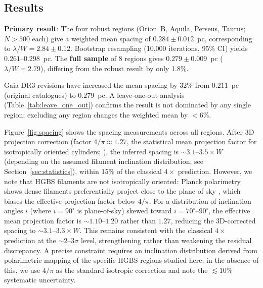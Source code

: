 \documentclass[twoside,twocolumn]{mnras}
\begin{document}
\subsection{Results}
\label{sec:results}

\textbf{Primary result}: The four robust regions (Orion~B, Aquila, Perseus, Taurus;
$N > 500$ each) give a weighted mean spacing of $0.284 \pm 0.012$~pc,
corresponding to $\lambda/W = 2.84 \pm 0.12$. Bootstrap resampling (10,000 iterations,
95\% CI) yields $0.261$--$0.298$~pc. The \textbf{full sample} of 8 regions gives
$0.279 \pm 0.009$~pc ($\lambda/W = 2.79$), differing from the robust result by
only 1.8\%.

Gaia DR3 revisions have increased the mean spacing by 32\% from $0.211$~pc (original
catalogues) to $0.279$~pc. A leave-one-out analysis (Table~\ref{tab:leave_one_out})
confirms the result is not dominated by any single region; excluding any region changes
the weighted mean by $<6\%$.

Figure~\ref{fig:spacing} shows the spacing measurements across all regions.
After 3D projection correction (factor $4/\pi \approx 1.27$, the statistical mean projection factor for isotropically oriented cylinders; \citealt{Andre2010}), the inferred spacing is ${\sim}3.1$--$3.5\times W$ (depending on the assumed filament inclination distribution; see Section~\ref{sec:statistics}), within 15\% of the classical $4\times$ prediction. However, we note that HGBS filaments are not isotropically oriented: Planck polarimetry shows dense filaments preferentially project close to the plane of sky \citep{Planck2016}, which biases the effective projection factor below $4/\pi$. For a distribution of inclination angles $i$ (where $i=90^\circ$ is plane-of-sky) skewed toward $i=70^\circ$--$90^\circ$, the effective mean projection factor is ${\sim}1.10$--$1.20$ rather than $1.27$, reducing the 3D-corrected spacing to ${\sim}3.1$--$3.3\times W$. This remains consistent with the classical $4\times$ prediction at the $\sim 2$--$3\sigma$ level, strengthening rather than weakening the residual discrepancy. A precise constraint requires an inclination distribution derived from polarimetric mapping of the specific HGBS regions studied here; in the absence of this, we use $4/\pi$ as the standard isotropic correction and note the $\lesssim 10\%$ systematic uncertainty.
\end{document}
